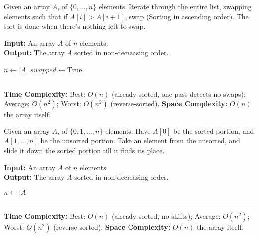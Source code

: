\begin{Func}
    Given an array $A$, of $\{0,\ldots,n\}$ elements. Iterate through the entire list, swapping elements such that
    if $A[i]>A[i+1]$, swap (Sorting in ascending order). The sort is done when there's nothing left to swap.

    \vspace{.5em}
    \noindent
    \textbf{Input:} An array $A$ of $n$ elements.\\
    \textbf{Output:} The array $A$ sorted in non-decreasing order.\\
    \begin{algorithm}[H]
        \SetAlgoLined
        $n \gets |A|$\;
        $\mathit{swapped} \gets \text{True}$\;
    \end{algorithm}

    \noindent
    \rule{\textwidth}{0.4pt}
    \noindent
    \textbf{Time Complexity:} Best: $O(n)$ (already sorted, one pass detects no swaps);  
    Average: $O(n^2)$;  
    Worst: $O(n^2)$ (reverse-sorted). \textbf{Space Complexity:} $O(n)$ the array itself.
\end{Func}

\begin{Func}
    Given an array $A$, of $\{0,1,\ldots,n\}$ elements. Have $A[0]$ be the sorted portion,
    and $A[1,\ldots,n]$ be the unsorted portion. Take an element from the unsorted,
    and slide it down the sorted portion till it finds its place.

    \vspace{.5em}
    \noindent
    \textbf{Input:} An array $A$ of $n$ elements.\\
    \textbf{Output:} The array $A$ sorted in non-decreasing order.\\
    \begin{algorithm}[H]
        \SetAlgoLined
        $n \gets |A|$\;
    \end{algorithm}

    \noindent
    \rule{\textwidth}{0.4pt}
    \noindent
    \textbf{Time Complexity:} Best: $O(n)$ (already sorted, no shifts);  
    Average: $O(n^2)$;  
    Worst: $O(n^2)$ (reverse-sorted).
    \textbf{Space Complexity:} $O(n)$ the array itself.
\end{Func}

